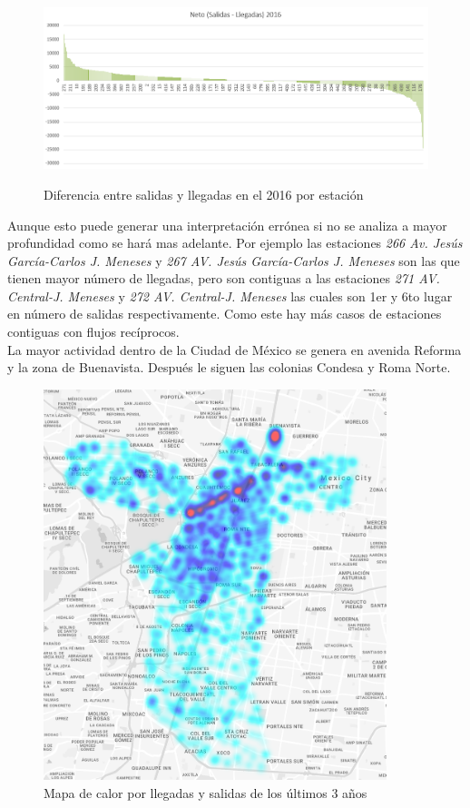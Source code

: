 \documentclass[12pt,spanish]{article}
\begin{document}
	\begin{figure}[H]
		\centering
		\includegraphics[width=15cm]{Imagenes/salidas_menos_llegadas_2016.png}\\
		\begin{centering}
		\caption{Diferencia entre salidas y llegadas en el 2016 por estación}
		\end{centering}
	\end{figure}
	Aunque esto puede generar una interpretación errónea si no se analiza a mayor profundidad como se hará mas adelante. Por ejemplo las estaciones \textit{266 Av. Jesús García-Carlos J. Meneses} y \textit{267 AV. Jesús García-Carlos J. Meneses} son las que tienen mayor número de llegadas, pero son contiguas a las estaciones \textit{271 AV. Central-J. Meneses} y \textit{272 AV. Central-J. Meneses} las cuales son 1er y 6to lugar en número de salidas respectivamente. Como este hay más casos de estaciones contiguas con flujos recíprocos.\\
	La mayor actividad dentro de la Ciudad de México se genera en avenida Reforma y la zona de Buenavista. Después le siguen las colonias Condesa y Roma Norte.
	\begin{figure}[H]
		\centering
		\includegraphics[width=10cm]{Imagenes/HeatmapEcobici2.png}
		\begin{centering}
		\caption{Mapa de calor por llegadas y salidas de los últimos 3 años}
		\end{centering}
	\end{figure}
\end{document}
